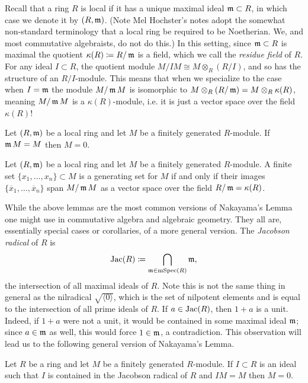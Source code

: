 \documentclass[Notebook.tex]{subfiles}
\begin{document}
Recall that a ring $R$ is local if it has a unique maximal ideal $\operatorname{\mathfrak{m}} \subset R$, in which case we denote it by $(R,\operatorname{\mathfrak{m}})$. (Note Mel Hochster's notes adopt the somewhat non-standard terminology that a local ring be required to be Noetherian. We, and most commutative algebraists, do not do this.) In this setting, since $\operatorname{\mathfrak{m}} \subset R$ is maximal the quotient $\kappa(R)\coloneqq R/\operatorname{\mathfrak{m}}$ is a field, which we call the \emph{residue field} of $R$. For any ideal $I\subset R$, the quotient module $M/IM \cong M\otimes_{R}(R/I)$, and so has the structure of an $R/I$-module. This means that when we specialize to the case when $I=\operatorname{\mathfrak{m}}$ the module $M/\operatorname{\mathfrak{m}} M$ is isomorphic to $M\otimes_{R}(R/\operatorname{\mathfrak{m}})=M\otimes_{R} \kappa(R)$, meaning $M/\operatorname{\mathfrak{m}} M$ is a $\kappa(R)$-module, i.e. it is just a vector space over the field $\kappa(R)$!

\begin{lemma}
	Let $(R, \operatorname{\mathfrak{m}})$ be a local ring and let $M$ be a finitely generated $R$-module. If $\operatorname{\mathfrak{m}} M = M$ then $M=0$. 
\end{lemma}

\begin{lemma}
	Let $(R, \operatorname{\mathfrak{m}})$ be a local ring and let $M$ be a finitely generated $R$-module. A finite set $\{x_1,\ldots,x_n\} \subset M$ is a generating set for $M$ if and only if their images $\{\overline{x}_{1},\ldots,\overline{x}_{n}\}$ span $M/\operatorname{\mathfrak{m}} M$ as a vector space over the field $R/\operatorname{\mathfrak{m}}=\kappa(R)$.
\end{lemma}

While the above lemmas are the most common versions of Nakayama's Lemma one might use in commutative algebra and algebraic geometry. They all are, essentially special cases or corollaries, of a more general version. The \emph{Jacobson radical} of $R$ is
\[
\text{Jac}(R)\coloneqq \bigcap_{\operatorname{\mathfrak{m}}\in \operatorname{mSpec}(R)}\operatorname{\mathfrak{m}},
\]
the intersection of all maximal ideals of $R$. Note this is not the same thing in general as the nilradical $\sqrt{\langle 0\rangle}$, which is the set of nilpotent elements and is equal to the intersection of all prime ideals of $R$. If $a\in \text{Jac}(R)$, then $1+a$ is a unit. Indeed, if $1+a$ were not a unit, it would be contained in some maximal ideal $\operatorname{\mathfrak{m}}$; since $a\in \operatorname{\mathfrak{m}}$ as well, this would force $1\in \operatorname{\mathfrak{m}}$, a contradiction. This observation will lead us to the following general version of Nakayama's Lemma.

\begin{lemma}
	Let $R$ be a ring and let $M$ be a finitely generated $R$-module. If $I \subset R$ is an ideal such that $I$ is contained in the Jacobson radical of $R$ and $IM=M$ then $M=0$. 
\end{lemma}
\end{document}
